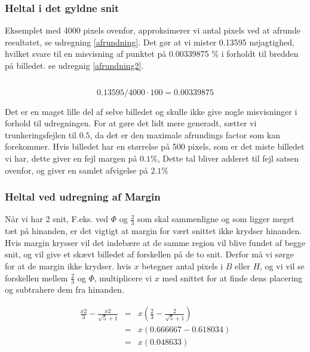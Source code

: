 \subsubsection*{Heltal i det gyldne snit}

Eksemplet med 4000 pixels ovenfor, approksimerer vi antal pixels ved at
afrunde resultatet, se udregning \ref{afrundning}. Det gør at vi mister
0.13595 nøjagtighed, hvilket svare til en misvisning af punktet på
0.00339875 $\%$ i forholdt til bredden på billedet. se udregnig
\ref{afrundning2}.

\begin{equation}
\end{equation}

\begin{equation}
	0.13595/4000 \cdot 100 = 0.00339875 \label{afrundning2}
\end{equation}

Det er en maget lille del af selve billedet og skulle ikke give nogle
misvisninger i forhold til udregningen. For at gøre det lidt mere
generadt, sætter vi trunkeringsfejlen til $0.5$, da det er den maximale
afrundings factor som kan forekommer. Hvis billedet har en størrelse på
500 pixels, som er det miste billedet vi har, dette giver en fejl margen
på $0.1\%$, Dette tal bliver adderet til fejl satsen ovenfor, og giver
en samlet afvigelse på $2.1\%$

\subsubsection{Heltal ved udregning af Margin}
Når vi har 2 snit, F.eks. ved $\varPhi$ og $\frac{2}{3}$ som skal sammenligne og
som ligger meget tæt på hinanden, er det vigtigt at margin for vært
snittet ikke krydser hinanden. Hvis margin krysser vil det indebære at de samme region
vil blive fundet af begge snit, og vil give et skævt billedet af
forskellen på de to snit. Derfor må vi sørge for at de margin ikke
krydser. hvis $x$ betegner antal pixels i $B$ eller $H$, og vi vil se
forskellen mellem $\frac{2}{3}$ og $\varPhi$, multiplicere vi $x$ med snittet for at
finde dens placering og subtrahere dem fra hinanden.

\begin{eqnarray}
	\frac{x2}{3} - \frac{x2}{\sqrt{5}+1} & = & x(\frac{2}{3} - \frac{2}{\sqrt{5} + 1}) \nonumber \\
	& = & x(0.666667-0.618034) \\ \nonumber
	& = & x(0.048633)
\end{eqnarray}

